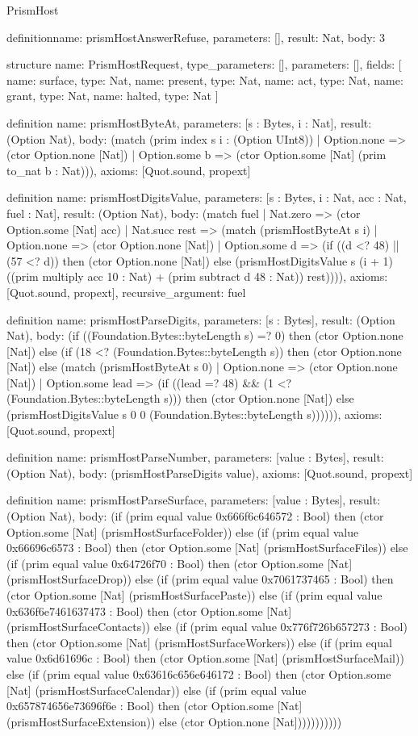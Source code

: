 \begin{lexlean}{PrismHost}
\begin{semanticmodule}
definition{name: prismHostAnswerRefuse, parameters: [], result: Nat, body: 3}

structure{
  name: PrismHostRequest,
  type_parameters: [],
  parameters: [],
  fields: [
    {name: surface, type: Nat},
    {name: present, type: Nat},
    {name: act, type: Nat},
    {name: grant, type: Nat},
    {name: halted, type: Nat}
  ]
}

definition{
  name: prismHostByteAt,
  parameters: [s : Bytes, i : Nat],
  result: (Option Nat),
  body: (match (prim index s i : (Option UInt8))
    | Option.none => (ctor Option.none [Nat])
    | Option.some b => (ctor Option.some [Nat] (prim to_nat b : Nat))),
  axioms: [Quot.sound, propext]
}

definition{
  name: prismHostDigitsValue,
  parameters: [s : Bytes, i : Nat, acc : Nat, fuel : Nat],
  result: (Option Nat),
  body: (match fuel
    | Nat.zero => (ctor Option.some [Nat] acc)
    | Nat.succ rest => (match (prismHostByteAt s i)
      | Option.none => (ctor Option.none [Nat])
      | Option.some d => (if ((d <? 48) || (57 <? d)) then (ctor Option.none [Nat]) else (prismHostDigitsValue s (i + 1) ((prim multiply acc 10 : Nat) + (prim subtract d 48 : Nat)) rest)))),
  axioms: [Quot.sound, propext],
  recursive_argument: fuel
}

definition{
  name: prismHostParseDigits,
  parameters: [s : Bytes],
  result: (Option Nat),
  body: (if ((Foundation.Bytes::byteLength s) =? 0) then (ctor Option.none [Nat]) else (if (18 <? (Foundation.Bytes::byteLength s)) then (ctor Option.none [Nat]) else (match (prismHostByteAt s 0)
    | Option.none => (ctor Option.none [Nat])
    | Option.some lead => (if ((lead =? 48) && (1 <? (Foundation.Bytes::byteLength s))) then (ctor Option.none [Nat]) else (prismHostDigitsValue s 0 0 (Foundation.Bytes::byteLength s)))))),
  axioms: [Quot.sound, propext]
}

definition{
  name: prismHostParseNumber,
  parameters: [value : Bytes],
  result: (Option Nat),
  body: (prismHostParseDigits value),
  axioms: [Quot.sound, propext]
}

definition{
  name: prismHostParseSurface,
  parameters: [value : Bytes],
  result: (Option Nat),
  body: (if (prim equal value 0x666f6c646572 : Bool) then (ctor Option.some [Nat] (prismHostSurfaceFolder)) else (if (prim equal value 0x66696c6573 : Bool) then (ctor Option.some [Nat] (prismHostSurfaceFiles)) else (if (prim equal value 0x64726f70 : Bool) then (ctor Option.some [Nat] (prismHostSurfaceDrop)) else (if (prim equal value 0x7061737465 : Bool) then (ctor Option.some [Nat] (prismHostSurfacePaste)) else (if (prim equal value 0x636f6e7461637473 : Bool) then (ctor Option.some [Nat] (prismHostSurfaceContacts)) else (if (prim equal value 0x776f726b657273 : Bool) then (ctor Option.some [Nat] (prismHostSurfaceWorkers)) else (if (prim equal value 0x6d61696c : Bool) then (ctor Option.some [Nat] (prismHostSurfaceMail)) else (if (prim equal value 0x63616c656e646172 : Bool) then (ctor Option.some [Nat] (prismHostSurfaceCalendar)) else (if (prim equal value 0x657874656e73696f6e : Bool) then (ctor Option.some [Nat] (prismHostSurfaceExtension)) else (ctor Option.none [Nat]))))))))))
}


\end{semanticmodule}
\end{lexlean}
